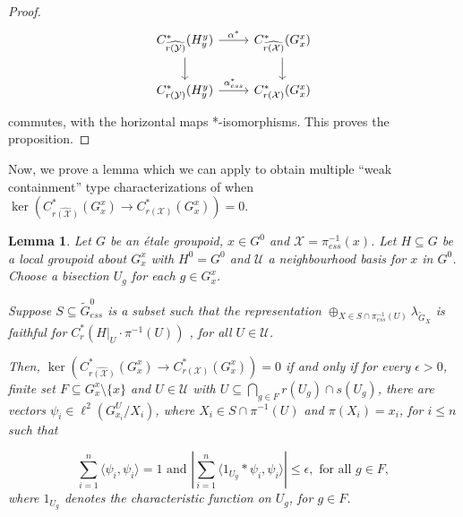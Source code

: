\documentclass[a4paper, 12pt]{amsart}
\newtheorem{lem}[thm]{Lemma}
\theoremstyle{definition}
\theoremstyle{remark}
\numberwithin{equation}{section}
\begin{document}
\begin{proof}
$$
\begin{tikzcd}
C^{*}_{\widehat{r(\mathcal{Y})}}(H^{y}_{y}) \arrow[d] \arrow[r, "\alpha^{*}"] & C^{*}_{\widehat{r(\mathcal{X})}}(G^{x}_{x}) \arrow[d] \\
C^{*}_{r(\mathcal{Y})}(H^{y}_{y}) \arrow[r, "\alpha^{*}_{ess}"]               & C^{*}_{r(\mathcal{X})}(G^{x}_{x})                    
\end{tikzcd}$$ commutes, with the horizontal maps *-isomorphisms. This proves the proposition.

\end{proof}

Now, we prove a lemma which we can apply to obtain multiple ``weak containment'' type characterizations of when $\ker(C^{*}_{\widehat{r(\mathcal{X})}}(G^{x}_{x})\to C^{*}_{r(\mathcal{X})}(G^{x}_{x})) = 0$.

\begin{lem}
\label{lem:groupidealcharlocwkcont}
    Let $G$ be an \'etale groupoid, $x\in G^{0}$ and $\mathcal{X} = \pi^{-1}_{ess}(x)$. Let $H\subseteq G$ be a local groupoid about $G^{x}_{x}$ with $H^{0} = G^{0}$ and $\mathcal{U}$ a neighbourhood basis for $x$ in $G^{0}$. Choose a bisection $U_{g}$ for each $g\in G^{x}_{x}$.
    
    Suppose $S\subseteq \tilde{G}_{ess}^{0}$ is a subset such that the representation $\oplus_{X\in S\cap\pi_{ess}^{-1}(U)}\lambda_{\tilde{G}_{X}}$ is faithful for $C^{*}_{r}(H|_{U}\cdot \pi^{-1}(U))$ , for all $U\in\mathcal{U}$.

    Then, $\ker(C^{*}_{\widehat{r(\mathcal{X})}}(G^{x}_{x})\to C^{*}_{r(\mathcal{X})}(G^{x}_{x})) = 0$ if and only if for every $\epsilon > 0$, finite set $F\subseteq G^{x}_{x}\setminus \{x\}$ and $U\in\mathcal{U}$ with  $U\subseteq \bigcap_{g\in F} r(U_{g})\cap s(U_{g})$, there are vectors $\psi_{i}\in \ell^{2}(G_{x_{i}}^{U}/X_{i})$, where $X_{i}\in S\cap \pi^{-1}(U)$ and $\pi(X_{i}) = x_{i}$, for $i\leq n$ such that

    $$\sum^{n}_{i=1}\langle \psi_{i}, \psi_{i}\rangle = 1\text{ and }|\sum^{n}_{i=1}\langle 1_{U_{g}} * \psi_{i}, \psi_{i}\rangle |\leq \epsilon, \text{ for all }g\in F,$$
    where $1_{U_{g}}$ denotes the characteristic function on $U_{g}$, for $g\in F$. 
\end{lem}
\end{document}
